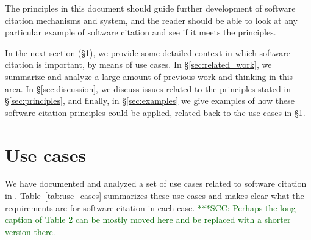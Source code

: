 \documentclass[11pt, oneside]{amsart}
\newcommand{\scnote}[1]{ {\textcolor{darkgreen} { ***SCC: #1 }}} %
\begin{document}
The principles in this document should guide further development of software citation
mechanisms and system, and the reader should be able to look at any particular example
of software citation and see if it meets the principles.

In the next section (\S\ref{sec:use_cases}), we provide some detailed context in which
software citation is important, by means of use cases.  In \S\ref{sec:related_work}, we
summarize and analyze a large amount of previous work and thinking in this area.  In \S\ref{sec:discussion}, we discuss issues related to the principles stated in \S\ref{sec:principles}, and finally,
in \S\ref{sec:examples} we give examples of how these software citation principles
could be applied, related back to the use cases in \S\ref{sec:use_cases}.


\section{Use cases}
\label{sec:use_cases}

We have documented and analyzed a set of use cases related to software citation in \cite{SC-Use-Cases}.
Table~\ref{tab:use_cases} summarizes these use cases and makes clear what the requirements are for software citation in each case.
\scnote{Perhaps the long caption of Table 2 can be mostly moved here and be replaced with a shorter version there.}
\end{document}
